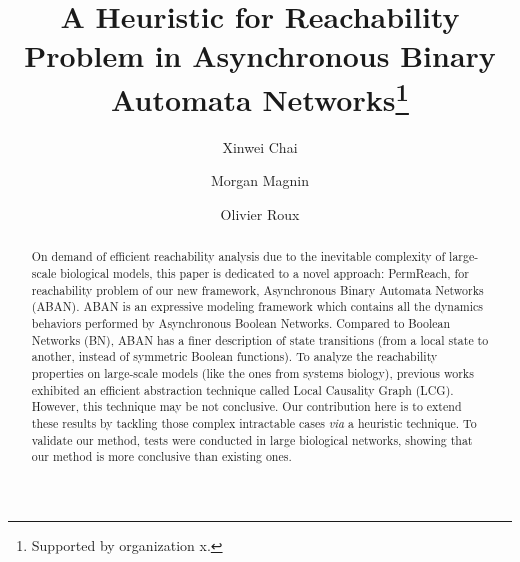 \documentclass[runningheads]{llncs}
\begin{document}
%
\title{A Heuristic for Reachability Problem in Asynchronous Binary Automata Networks\thanks{Supported by organization x.}}
%
%
\author{Xinwei Chai\and Morgan Magnin \and Olivier Roux}
%
%
%
\maketitle              %
%
\begin{abstract}
On demand of efficient reachability analysis due to the inevitable complexity of large-scale biological models, this paper is dedicated to a novel approach: PermReach, for reachability problem of our new framework, Asynchronous Binary Automata Networks (ABAN). 
ABAN is an expressive modeling framework which contains all the dynamics behaviors performed by Asynchronous Boolean Networks. 
Compared to Boolean Networks (BN), ABAN has a finer description of state transitions (from a local state to another, instead of symmetric Boolean functions). 
To analyze the reachability properties on large-scale models (like the ones from systems biology), previous works exhibited an efficient abstraction technique called Local Causality Graph (LCG). 
However, this technique may be not conclusive. Our contribution here is to extend these results by tackling those complex intractable cases \textit{via} a heuristic technique. 
To validate our method, tests were conducted in large biological networks, showing that our method is more conclusive than existing ones.
\cite{marx2013}

\end{abstract}
\end{document}
